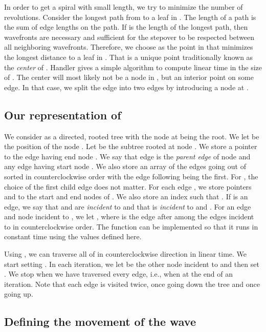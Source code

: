 \documentclass[3p]{elsarticle}
\begin{document}
In order to get a spiral with small length, we try to minimize the number of revolutions.
Consider the longest path from  to a leaf in .
The length of a path is the sum of edge lengths on the path.
If  is the length of the longest path, then  wavefronts
are necessary and sufficient for the stepover to be respected between all neighboring wavefronts.
Therefore, we choose  as the point in  that minimizes the longest distance to a leaf in
. That is a unique point traditionally known as the \emph{center} of .
Handler \cite{handler1973} gives a simple algorithm to compute  linear time in the size of
.
The center will most likely not be a node in , but an interior point on some edge. In that
case, we split the edge into two edges by introducing a node at .

\subsection{Our representation of }

We consider  as a directed, rooted tree with the node  at  being the root.
We let  be the position of the node . Let
 be the subtree rooted at node .
We store a pointer  to the edge having end node .
We say that edge  is the \emph{parent edge} of node  and any edge
having start node .
We also store an array
 of the edges going out of  sorted in counterclockwise order with the
edge following  being the first. For , the choice of the first child
edge does not matter.
For each edge , we store pointers  and  to 
the start and end nodes of . We also store an index 
such that . If  is an edge, we say that 
and  are \emph{incident} to  and that  is \emph{incident} to
 and .
For an edge  and node  incident to ,
we let ,
where  is the edge after  among the edges incident to  in counterclockwise
order. The function  can be implemented so that it runs in constant time
using the values defined here.

Using , we can traverse all of  in counterclockwise direction in linear time.
We start setting .
In each iteration, we let  be the other node incident to  and
then set .
We stop when we have traversed every edge, i.e., when
 at the end of an iteration. Note that each edge 
is visited twice, once going down the tree  and once going up.

\subsection{Defining the movement of the wave}\label{movementOfWave}
\end{document}
